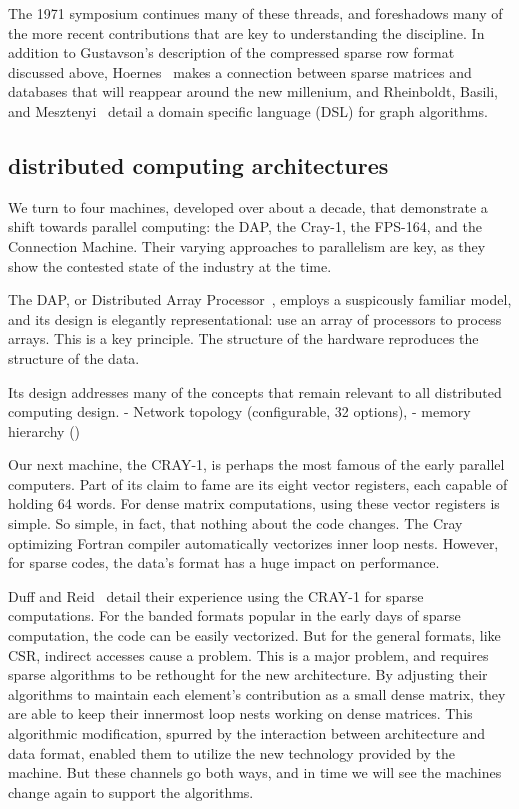 The 1971 symposium continues many of these threads, and foreshadows many of the more recent contributions that are key to understanding the discipline.
In addition to Gustavson's description of the compressed sparse row format discussed above, Hoernes~\cite{hoernes1972generalized} makes a connection between sparse matrices and databases that will reappear around the new millenium, and Rheinboldt, Basili, and Mesztenyi~\cite{rheinboldt1972graal} detail a domain specific language (DSL) for graph algorithms.



\subsection{distributed computing architectures}

We turn to four machines, developed over about a decade, that demonstrate a shift towards parallel computing: the DAP, the Cray-1, the FPS-164, and the Connection Machine.
Their varying approaches to parallelism are key, as they show the contested state of the industry at the time.

The DAP, or Distributed Array Processor~\cite{reddaway1973dap}, employs a suspicously familiar model, and its design is elegantly representational: use an array of processors to process arrays.
This is a key principle. 
The structure of the hardware reproduces the structure of the data. 

Its design addresses many of the concepts that remain relevant to all distributed computing design.
- Network topology (configurable, 32 options), 
- memory hierarchy ()

Our next machine, the CRAY-1, is perhaps the most famous of the early parallel computers. 
Part of its claim to fame are its eight vector registers, each capable of holding 64 words.
For dense matrix computations, using these vector registers is simple.
So simple, in fact, that nothing about the code changes. 
The Cray optimizing Fortran compiler automatically vectorizes inner loop nests.
However, for sparse codes, the data's format has a huge impact on performance.

Duff and Reid~\cite{duff1982experience} detail their experience using the CRAY-1 for sparse computations. 
For the banded formats popular in the early days of sparse computation, the code can be easily vectorized. 
But for the general formats, like CSR, indirect accesses cause a problem. 
This is a major problem, and requires sparse algorithms to be rethought for the new architecture.
By adjusting their algorithms to maintain each element's contribution as a small dense matrix, they are able to keep their innermost loop nests working on dense matrices.
This algorithmic modification, spurred by the interaction between architecture and data format, enabled them to utilize the new technology provided by the machine.
But these channels go both ways, and in time we will see the machines change again to support the algorithms.

